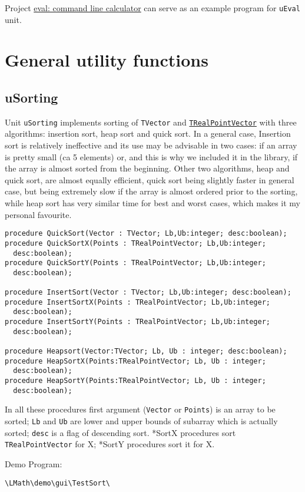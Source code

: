 \documentclass[12pt,a4paper,oneside]{article}
\newcommand{\code}[1]{\texttt{#1}}
\begin{document}
Project \href{https://sourceforge.net/projects/eval-command-line-calculator/}{eval: command line calculator} can serve as an example program for \code{uEval} unit.
\section{General utility functions}
\subsection{uSorting}
Unit \code{uSorting} implements sorting of \code{TVector} and \hyperref[sec:trealpoint]{\code{TRealPointVector}} with three algorithms: insertion sort, heap sort and quick sort. In a general case, Insertion sort is relatively ineffective and its use may be advisable in two cases: if an array is pretty small (ca 5 elements) or, and this is why we included it in the library, if the array is almost sorted from the beginning. Other two algorithms, heap and quick sort, are almost equally efficient, quick sort being slightly faster in general case, but being extremely slow if the array is almost ordered prior to the sorting, while heap sort has very similar time for best and worst cases, which makes it my personal favourite.
\begin{verbatim}
procedure QuickSort(Vector : TVector; Lb,Ub:integer; desc:boolean);
procedure QuickSortX(Points : TRealPointVector; Lb,Ub:integer;
  desc:boolean);
procedure QuickSortY(Points : TRealPointVector; Lb,Ub:integer;
  desc:boolean);

procedure InsertSort(Vector : TVector; Lb,Ub:integer; desc:boolean);
procedure InsertSortX(Points : TRealPointVector; Lb,Ub:integer;
  desc:boolean);
procedure InsertSortY(Points : TRealPointVector; Lb,Ub:integer;
  desc:boolean);

procedure Heapsort(Vector:TVector; Lb, Ub : integer; desc:boolean);
procedure HeapSortX(Points:TRealPointVector; Lb, Ub : integer;
  desc:boolean);
procedure HeapSortY(Points:TRealPointVector; Lb, Ub : integer;
  desc:boolean);
\end{verbatim}
In all these procedures first argument (\code{Vector} or \code{Points}) is an array to be sorted; \code{Lb} and \code{Ub} are lower and upper bounds of subarray which is actually sorted; \code{desc} is a flag of descending sort. *SortX procedures sort \code{TRealPointVector} for X; *SortY procedures sort it for X.

Demo Program: \begin{verbatim}
\LMath\demo\gui\TestSort\
\end{verbatim}
\end{document}
